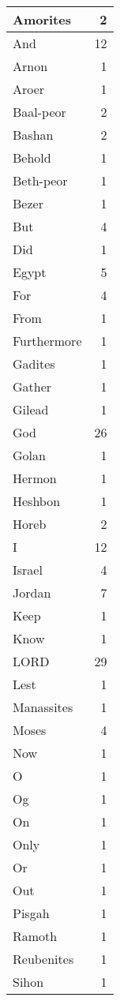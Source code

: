 \begin{center}
\begin{longtable}{l|r}
\hline \hline
\endlastfoot
Amorites & 2 \\ \hline
And & 12 \\ \hline
Arnon & 1 \\ \hline
Aroer & 1 \\ \hline
Baal-peor & 2 \\ \hline
Bashan & 2 \\ \hline
Behold & 1 \\ \hline
Beth-peor & 1 \\ \hline
Bezer & 1 \\ \hline
But & 4 \\ \hline
Did & 1 \\ \hline
Egypt & 5 \\ \hline
For & 4 \\ \hline
From & 1 \\ \hline
Furthermore & 1 \\ \hline
Gadites & 1 \\ \hline
Gather & 1 \\ \hline
Gilead & 1 \\ \hline
God & 26 \\ \hline
Golan & 1 \\ \hline
Hermon & 1 \\ \hline
Heshbon & 1 \\ \hline
Horeb & 2 \\ \hline
I & 12 \\ \hline
Israel & 4 \\ \hline
Jordan & 7 \\ \hline
Keep & 1 \\ \hline
Know & 1 \\ \hline
LORD & 29 \\ \hline
Lest & 1 \\ \hline
Manassites & 1 \\ \hline
Moses & 4 \\ \hline
Now & 1 \\ \hline
O & 1 \\ \hline
Og & 1 \\ \hline
On & 1 \\ \hline
Only & 1 \\ \hline
Or & 1 \\ \hline
Out & 1 \\ \hline
Pisgah & 1 \\ \hline
Ramoth & 1 \\ \hline
Reubenites & 1 \\ \hline
Sihon & 1 \\ \hline

\end{longtable}
\end{center}
